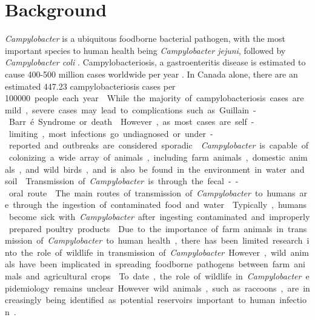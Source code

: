 \documentclass[letterpaper,titlepage,12pt]{article}
\begin{document}
\newpage
\section{Background} %







\textit{Campylobacter} is a ubiquitous foodborne bacterial pathogen, with the most important species to human health being \textit{Campylobacter jejuni}, followed by \textit{Campylobacter coli}  \parencite{mutschall2020campylobacter}. Campylobacteriosis, a gastroenteritis disease is estimated to cause 400-500 million cases worldwide per year \parencite{DuongTri2009CsoC}. 
In Canada alone, there are an estimated 447.23 campylobacteriosis cases per \SI{100000} people each year \parencite{thomas2013estimates}. While the majority of campylobacteriosis cases are mild, severe cases may lead to complications such as Guillain-Barr\'e Syndrome or death \parencite{DuongTri2009CsoC}. However, as most cases are self-limiting, most infections go undiagnosed or under-reported and outbreaks are considered sporadic \parencite{MaganaMaria2017Iitg, ravel2016non}. 

\textit{Campylobacter} is capable of colonizing a wide array of animals, including farm animals, domestic animals, and wild birds, and is also be found in the environment in water and soil \parencite{oh2018frequent}. Transmission of \textit{Campylobacter} is through the fecal--oral route \parencite{kaakoush2015global}. 
The main routes of transmission of \textit{Campylobacter} to humans are through the ingestion of contaminated food and water \parencite{kaakoush2015global}. Typically, humans become sick with \textit{Campylobacter} after ingesting contaminated and improperly prepared poultry products \parencite{newell2017campylobacter}.
Due to the importance of farm animals in transmission of \textit{Campylobacter} to human health, there has been limited research into the role of wildlife in transmission of \textit{Campylobacter}. However, wild animals have been implicated in spreading foodborne pathogens between farm animals and agricultural crops \parencite{erickson2016overview}. To date, the role of wildlife in \textit{Campylobacter} epidemiology remains unclear. However wild animals, such as raccoons, are increasingly being identified as potential reservoirs important to human infection \parencite{mutschall2020campylobacter, BondoKristinJ2019SCCd, lee2011summary, viswanathan2017molecular}. 
\end{document}
